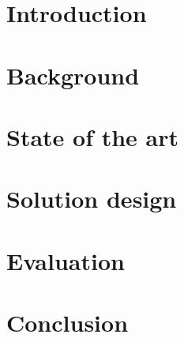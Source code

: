 \documentclass{Configuration_Files/PoliMi3i_thesis}
\begin{document}
\chapter{Introduction}

\chapter{Background}

\chapter{State of the art}

\chapter{Solution design}\label{solutionDesign}

\chapter{Evaluation}

\chapter{Conclusion}





\cleardoublepage
{} %
\end{document}
